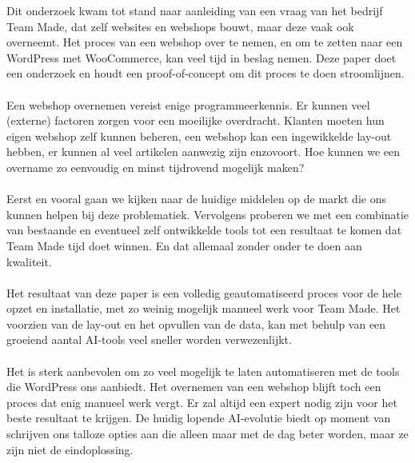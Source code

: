 Dit onderzoek kwam tot stand naar aanleiding van een vraag van het bedrijf Team Made, dat zelf websites en webshops bouwt, maar deze vaak ook overneemt. Het proces van een webshop over te nemen, en om te zetten naar een WordPress met WooCommerce, kan veel tijd in beslag nemen. Deze paper doet een onderzoek en houdt een proof-of-concept om dit proces te doen stroomlijnen.
\\\\
Een webshop overnemen vereist enige programmeerkennis. Er kunnen veel (externe) factoren zorgen voor een moeilijke overdracht. Klanten moeten hun eigen webshop zelf kunnen beheren, een webshop kan een ingewikkelde lay-out hebben, er kunnen al veel artikelen aanwezig zijn enzovoort. Hoe kunnen we een overname zo eenvoudig en minst tijdrovend mogelijk maken?
\\\\
Eerst en vooral gaan we kijken naar de huidige middelen op de markt die ons kunnen helpen bij deze problematiek. Vervolgens proberen we met een combinatie van bestaande en eventueel zelf ontwikkelde tools tot een resultaat te komen dat Team Made tijd doet winnen. En dat allemaal zonder onder te doen aan kwaliteit. 
\\\\
Het resultaat van deze paper is een volledig geautomatiseerd proces voor de hele opzet en installatie, met zo weinig mogelijk manueel werk voor Team Made. Het voorzien van de lay-out en het opvullen van de data, kan met behulp van een groeiend aantal AI-tools veel sneller worden verwezenlijkt.
\\\\
Het is sterk aanbevolen om zo veel mogelijk te laten automatiseren met de tools die WordPress ons aanbiedt. Het overnemen van een webshop blijft toch een proces dat enig manueel werk vergt. Er zal altijd een expert nodig zijn voor het beste resultaat te krijgen. De huidig lopende AI-evolutie biedt op moment van schrijven ons talloze opties aan die alleen maar met de dag beter worden, maar ze zijn niet de eindoplossing.